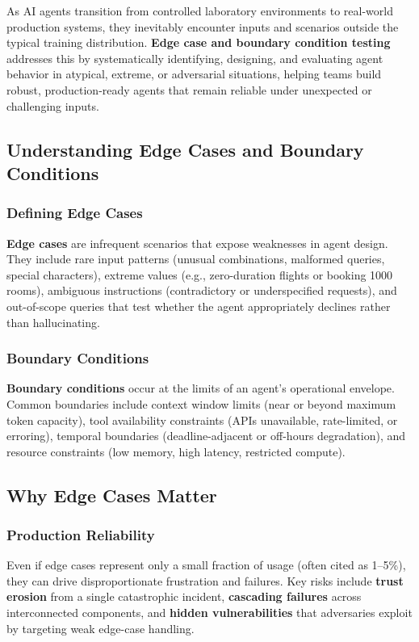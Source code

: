 \begin{TNtwocol}
As AI agents transition from controlled laboratory environments to real-world production systems, they inevitably encounter inputs and scenarios outside the typical training distribution. \textbf{Edge case and boundary condition testing} addresses this by systematically identifying, designing, and evaluating agent behavior in atypical, extreme, or adversarial situations, helping teams build robust, production-ready agents that remain reliable under unexpected or challenging inputs.

\subsection*{Understanding Edge Cases and Boundary Conditions}

\subsubsection*{Defining Edge Cases}
\textbf{Edge cases} are infrequent scenarios that expose weaknesses in agent design. They include rare input patterns (unusual combinations, malformed queries, special characters), extreme values (e.g., zero-duration flights or booking 1000 rooms), ambiguous instructions (contradictory or underspecified requests), and out-of-scope queries that test whether the agent appropriately declines rather than hallucinating.

\subsubsection*{Boundary Conditions}
\textbf{Boundary conditions} occur at the limits of an agent's operational envelope. Common boundaries include context window limits (near or beyond maximum token capacity), tool availability constraints (APIs unavailable, rate-limited, or erroring), temporal boundaries (deadline-adjacent or off-hours degradation), and resource constraints (low memory, high latency, restricted compute).

\subsection*{Why Edge Cases Matter}

\subsubsection*{Production Reliability}
Even if edge cases represent only a small fraction of usage (often cited as 1--5\%), they can drive disproportionate frustration and failures. Key risks include \textbf{trust erosion} from a single catastrophic incident, \textbf{cascading failures} across interconnected components, and \textbf{hidden vulnerabilities} that adversaries exploit by targeting weak edge-case handling.


\end{TNtwocol}

